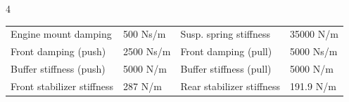 \documentclass[portrait,a0b,final,a4resizeable]{a0poster}
\begin{document}
\begin{multicols}{4}
\begin{tablehere}
\begin{tabular}{llll}
    Engine mount damping & 500 Ns/m &
                                                                           Susp.
                                                                           spring
                                                                           stiffness
                                                      & 35000 N/m\\
    Front damping (push) & 2500 Ns/m & Front damping (pull) & 5000 Ns/m \\ Buffer
                                                                        stiffness
                                                                        (push)
                                                      & 5000 N/m &
    Buffer stiffness (pull) & 5000 N/m \\ Front stabilizer stiffness & 287 N/m &
                                                                              Rear
                                                                                stabilizer
                                                                                stiffness
                                                      & 191.9 N/m\\





\end{tabular}
\end{tablehere}
\end{multicols}
\end{document}

